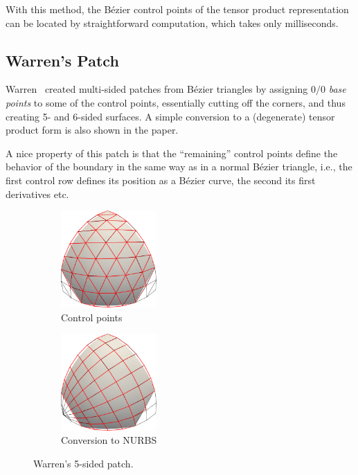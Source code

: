 \documentclass[9pt,academicons]{article}
\begin{document}
With this method, the B\'ezier control points of the tensor product representation
can be located by straightforward computation, which takes only milliseconds.

\subsection{Warren's Patch}
Warren~\cite{Warren:1992} created multi-sided patches from B\'ezier triangles by assigning $0/0$
\emph{base points} to some of the control points, essentially cutting off the corners, and thus
creating 5- and 6-sided surfaces. A simple conversion to a (degenerate) tensor product form is
also shown in the paper.

A nice property of this patch is that the ``remaining'' control points define the behavior of the
boundary in the same way as in a normal B\'ezier triangle, i.e., the first control row defines
its position as a B\'ezier curve, the second its first derivatives etc.
\begin{figure}[h!]
  \begin{subfigure}{0.50\textwidth}
    \centering
    \includegraphics[width = 0.4\textwidth]{images/warren-cnet.png}
    \caption{Control points}
    \label{fig:warren-cnet}
  \end{subfigure}
  \begin{subfigure}{0.50\textwidth}
    \centering
    \includegraphics[width = 0.4\textwidth]{images/warren-quad.png}
    \caption{Conversion to NURBS}
    \label{fig:warren-cnet}
  \end{subfigure}
  \caption{Warren's 5-sided patch.}
  \label{fig:warren}
\end{figure}
\end{document}
